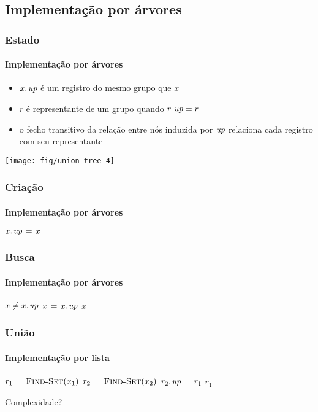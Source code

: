 \documentclass{beamer}
\begin{document}
\subsection{Implementação por árvores}

\begin{frame}
\frametitle{Estado}
\framesubtitle{Implementação por árvores}

\begin{itemize}
\item $\attrib{x}{up}$ é um registro do mesmo grupo que $x$
\item $r$ é representante de um grupo quando $\attrib{r}{up} = r$
\item o fecho transitivo da relação entre nós induzida por $\id{up}$ 
 relaciona cada registro com seu representante
\end{itemize}
\pause
\begin{center}
\texttt{[image: fig/union-tree-4]}
\end{center}

\end{frame}

\begin{frame}
\frametitle{Criação}
\framesubtitle{Implementação por árvores}

\begin{codebox}
\li $\attrib{x}{up} \gets x$
\end{codebox}

\end{frame}

\begin{frame}
\frametitle{Busca}
\framesubtitle{Implementação por árvores}

\begin{codebox}
\li \While $x \neq \attrib{x}{up}$
\li \Do $x \gets \attrib{x}{up}$
    \End
\li \Return $x$
\end{codebox}

\end{frame}

\begin{frame}
\frametitle{União}
\framesubtitle{Implementação por lista}

\begin{codebox}
\li $r_1 \mathrel{\hspace{1pt}=\hspace{1pt}} \textnormal{\scshape Find-Set}(x_1)$
\li $r_2 \mathrel{\hspace{1pt}=\hspace{1pt}} \textnormal{\scshape Find-Set}(x_2)$
\li $\attrib{r_2}{up} \gets r_1$
\li \Return $r_1$
\end{codebox}
\pause
\alert{Complexidade?}
\end{frame}
\end{document}
